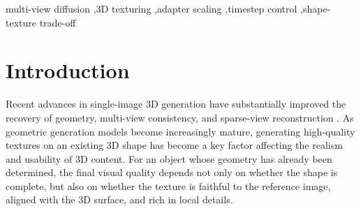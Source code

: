 \documentclass[times,twocolumn,final]{elsarticle}
\begin{document}
\begin{frontmatter}
\begin{abstract}
Multi-view diffusion pipelines for 3D asset texturing commonly inject geometric conditions through adapter modules, but a single global scale ignores that residuals act at different UNet depths and denoising stages. We study layer-wise stage-aware adapter scaling, a training-free inference control that assigns conservative residual strengths to shallow layers while scheduling stronger correction in selected stages of deeper layers. On a shared-input 24-object, three-seed development ablation, layer-wise controls improve foreground fidelity over fixed-low scaling, while layer-fixed-mean and a late-high layer schedule outperform the originally motivated layer-LHL variant on selected targets. A previously completed strict-276 layer-LHL evaluation shows that the gain transfers beyond the development objects, but does not establish a unique temporal optimum. We therefore present the method as a reusable layer-wise inference control with metric-dependent trade-offs, rather than a universal schedule selector.
\end{abstract}

\begin{keyword}
\KWD
multi-view diffusion \sep 3D texturing \sep adapter scaling \sep timestep control \sep shape-texture trade-off
\end{keyword}

\end{frontmatter}

\linenumbers

\section{Introduction}
\label{sec:intro}

Recent advances in single-image 3D generation have substantially improved the recovery of geometry, multi-view consistency, and sparse-view reconstruction \cite{liu2023zero1to3,shi2023zero123pp,liu2023syncdreamer,long2023wonder3d,shi2024mvdream,wang2023imagedream,xu2024instantmesh,ke2024era3d}. As geometric generation models become increasingly mature, generating high-quality textures on an existing 3D shape has become a key factor affecting the realism and usability of 3D content. For an object whose geometry has already been determined, the final visual quality depends not only on whether the shape is complete, but also on whether the texture is faithful to the reference image, aligned with the 3D surface, and rich in local details.
\end{document}
